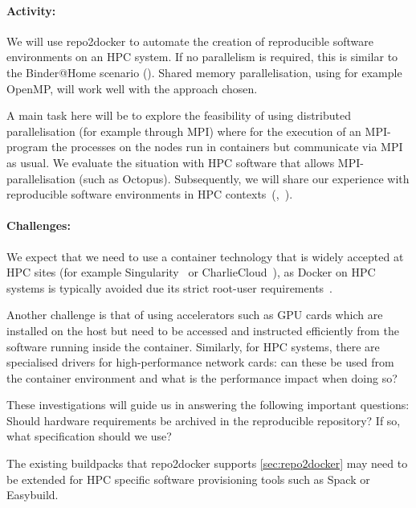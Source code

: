 \begin{task}
\paragraph*{Activity:} We will use repo2docker to automate the creation of
reproducible software environments on an HPC system. If no parallelism is
required, this is similar to the Binder@Home scenario
(). Shared memory parallelisation, using for
example OpenMP, will work well with the approach chosen.

A main task here will be to explore the feasibility of using distributed
parallelisation (for example through MPI) where for the execution of an
MPI-program the processes on the nodes run in containers but communicate via MPI
as usual. We evaluate the situation with HPC software that allows
MPI-parallelisation (such as Octopus). Subsequently, we will share our experience with
reproducible software environments in HPC
contexts~(,~).

\paragraph*{Challenges:} We expect that we need to use a container technology
that is widely accepted at HPC sites (for example Singularity~\cite{Singularity2017} or CharlieCloud~\cite{CharlieCloud2017}), as Docker
on HPC systems is typically avoided due its strict root-user requirements~\cite{Gerhardt_2017}.

Another challenge is that of using accelerators such as GPU cards which are
installed on the host but need to be accessed and instructed efficiently from the software running
inside the container.
Similarly, for HPC systems, there are specialised drivers for high-performance
network cards: can these be used from the container environment and what
is the performance impact when doing so?  \cite{Liu2021}

These investigations will guide us in answering the following important questions:
Should hardware requirements be archived in the reproducible repository?
If so, what specification should we use?

The existing buildpacks that repo2docker supports
\ref{sec:repo2docker} may need to be extended for
HPC specific software provisioning tools such as Spack or Easybuild.


\end{task}





